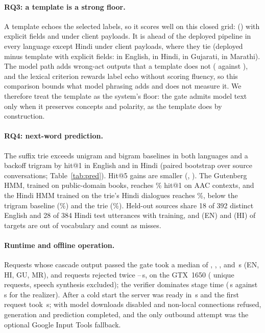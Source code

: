 \paragraph{RQ3: a template is a strong floor.}
A template echoes the selected labels, so it scores well on this closed grid: \XTmplSSucc{} (\XTmplSSuccPct{}) with explicit fields and \XTmplUSucc{} under client payloads.
It is ahead of the deployed pipeline in every language except Hindi under client payloads, where they tie (deployed minus template with explicit fields: \PSTEN{} in English, \PSTHI{} in Hindi, \PSTGU{} in Gujarati, \PSTMR{} in Marathi).
The model path adds wrong-act outputs that a template does not (\XDepSWrong{} against \XTmplSWrong{}), and the lexical criterion rewards label echo without scoring fluency, so this comparison bounds what model phrasing adds and does not measure it.
We therefore treat the template as the system's floor: the gate admits model text only when it preserves concepts and polarity, as the template does by construction.



\paragraph{RQ4: next-word prediction.}
The suffix trie exceeds unigram and bigram baselines in both languages and a backoff trigram by \PredDENOneTri{} hit@1 in English and \PredDHIOneTri{} in Hindi (paired bootstrap over source conversations; Table~\ref{tab:pred}). Hit@5 gains are smaller (\PredDENFiveTri{}, \PredDHIFiveTri{}).
The Gutenberg HMM, trained on public-domain books, reaches \GutHitOne{}\% hit@1 on AAC contexts, and the Hindi HMM trained on the trie's Hindi dialogues reaches \HiHmmHitOne{}\%, below the trigram baseline (\PredHIOneTri{}\%) and the trie (\PredHIOneInf{}\%).
Held-out sources share 18 of 392 distinct English and 28 of 384 Hindi test utterances with training, and \PredOOVEN{} (EN) and \PredOOVHI{} (HI) of targets are out of vocabulary and count as misses.

\paragraph{Runtime and offline operation.}
Requests whose cascade output passed the gate took a median of \LatMedAccEN{}, \LatMedAccHI{}, \LatMedAccGU{}, and \LatMedAccMR{}\,s (EN, HI, GU, MR), and requests rejected twice \LatFbMin{}--\LatFbMax{}\,s, on the GTX~1650 (\NUniqueReq{} unique requests, speech synthesis excluded); the verifier dominates stage time (\StageLlmThree{}\,s against \StageLlmOne{}\,s for the realizer).
After a cold start the server was ready in \OffReady{}\,s and the first request took \OffFirstEn{}\,s; with model downloads disabled and non-local connections refused, generation and prediction completed, and the only outbound attempt was the optional Google Input Tools fallback.

